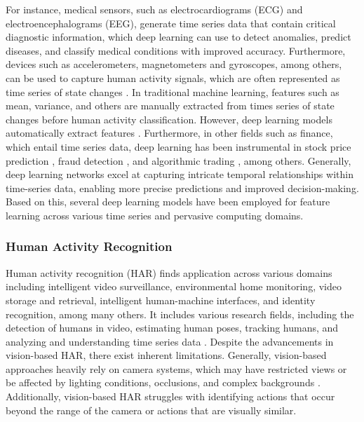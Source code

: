 \documentclass[preprint,12pt]{elsarticle}
\begin{document}
For instance, medical sensors, such as electrocardiograms (ECG) and electroencephalograms (EEG), generate time series data that contain critical diagnostic information, which deep learning can use to detect anomalies, predict diseases, and classify medical conditions with improved accuracy. Furthermore, devices such as accelerometers, magnetometers and gyroscopes, among others, can be used to capture human activity signals, which are often represented as time series of state changes \citep{ige2022survey}. In traditional machine learning, features such as mean, variance, and others are manually extracted from times series of state changes before human activity classification. However, deep learning models automatically extract features \citep{mohd_noor_feature_2021}. Furthermore, in other fields such as finance, which entail time series data, deep learning has been instrumental in stock price prediction \citep{singh2017stock}, fraud detection \citep{zhang2021hoba}, and algorithmic trading \citep{lei2020deep}, among others. Generally, deep learning networks excel at capturing intricate temporal relationships within time-series data, enabling more precise predictions and improved decision-making. Based on this, several deep learning models have been employed for feature learning across various time series and pervasive computing domains.

\subsubsection{Human Activity Recognition} 
Human activity recognition (HAR) finds application across various domains including intelligent video surveillance, environmental home monitoring, video storage and retrieval, intelligent human-machine interfaces, and identity recognition, among many others. It includes various research fields, including the detection of humans in video, estimating human poses, tracking humans, and analyzing and understanding time series data \citep{zhang2019comprehensive}. Despite the advancements in vision-based HAR, there exist inherent limitations. Generally, vision-based approaches heavily rely on camera systems, which may have restricted views or be affected by lighting conditions, occlusions, and complex backgrounds \citep{ige2022survey}. Additionally, vision-based HAR struggles with identifying actions that occur beyond the range of the camera or actions that are visually similar.
\end{document}

